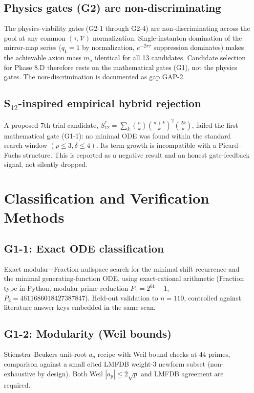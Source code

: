 \documentclass[aps,prd,twocolumn,nofootinbib,superscriptaddress,10pt]{revtex4-2}
\begin{document}
\subsection{Physics gates (G2) are non-discriminating}

The physics-viability gates (G2-1 through G2-4) are non-discriminating across the pool at any common $(\tau, \mathcal{V})$ normalization. Single-instanton domination of the mirror-map series ($q_1 = 1$ by normalization, $e^{-2\pi\tau}$ suppression dominates) makes the achievable axion mass $m_a$ identical for all 13 candidates. Candidate selection for Phase 8.D therefore rests on the mathematical gates (G1), not the physics gates. The non-discrimination is documented as gap GAP-2.

\subsection{S$_{12}$-inspired empirical hybrid rejection}

A proposed 7th trial candidate, $S_{12}^* = \sum_k \binom{n}{k} \binom{n+k}{k}^2 \binom{2k}{k}$, failed the first mathematical gate (G1-1): no minimal ODE was found within the standard search window $(\rho \le 3, \delta \le 4)$. Its term growth is incompatible with a Picard--Fuchs structure. This is reported as a negative result and an honest gate-feedback signal, not silently dropped.

\section{Classification and Verification Methods}

\subsection{G1-1: Exact ODE classification}

Exact modular+Fraction nullspace search for the minimal shift recurrence and the minimal generating-function ODE, using exact-rational arithmetic (Fraction type in Python, modular prime reduction $P_1 = 2^{61}-1$, $P_2 = 4611686018427387847$). Held-out validation to $n=110$, controlled against literature answer keys embedded in the same scan.

\subsection{G1-2: Modularity (Weil bounds)}

Stienstra--Beukers unit-root $a_p$ recipe with Weil bound checks at 44 primes, comparison against a small cited LMFDB weight-3 newform subset (non-exhaustive by design). Both Weil $|a_p| \le 2\sqrt{p}$ and LMFDB agreement are required.
\end{document}
